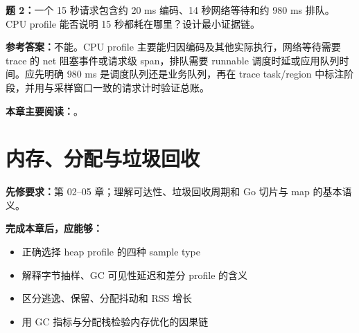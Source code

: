 \documentclass[UTF8,fontset=fandol,openany,11pt]{ctexbook}
\begin{document}
\noindent\textbf{题 2：}一个 15 秒请求包含约 20 ms 编码、14 秒网络等待和约 980 ms 排队。CPU profile 能否说明 15 秒都耗在哪里？设计最小证据链。

\noindent\textbf{参考答案：}不能。CPU profile 主要能归因编码及其他实际执行，网络等待需要 trace 的 net 阻塞事件或请求级 span，排队需要 runnable 调度时延或应用队列时间。应先明确 980 ms 是调度队列还是业务队列，再在 trace task/region 中标注阶段，并用与采样窗口一致的请求计时验证总账。

\medskip\noindent\textbf{本章主要阅读：}\cite{tools-pprof}\cite{tools-http-pprof}\cite{tools-labels}\cite{tools-label-runtime}\cite{tools-pprof-cli}。
\chapter{内存、分配与垃圾回收}
\label{ch:06}
\par\medskip
\noindent\textbf{先修要求：}第 02–05 章；理解可达性、垃圾回收周期和 Go 切片与 map 的基本语义。

\noindent\textbf{完成本章后，应能够：}
\begin{itemize}
\item 正确选择 heap profile 的四种 sample type
\item 解释字节抽样、GC 可见性延迟和差分 profile 的含义
\item 区分逃逸、保留、分配抖动和 RSS 增长
\item 用 GC 指标与分配栈检验内存优化的因果链
\end{itemize}
\end{document}
